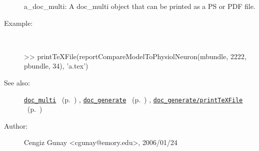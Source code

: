 \begin{description}
	a\_doc\_multi: A doc\_multi object that can be printed as a PS or PDF file.
%
\item[Example:]~
\begin{lyxcode} >> printTeXFile(reportCompareModelToPhysiolNeuron(mbundle, 2222, pbundle, 34), 'a.tex')
\\%
\end{lyxcode}
%
\item[See also:]%
\hyperlink{ref_doc_multi}{\texttt{doc\_multi}}%
\ (p.~\pageref{ref_doc_multi})%
%
, \hyperlink{ref_doc_generate}{\texttt{doc\_generate}}%
\ (p.~\pageref{ref_doc_generate})%
%
, \hyperlink{ref_doc_generate__printTeXFile}{\texttt{doc\_generate/printTeXFile}}%
\ (p.~\pageref{ref_doc_generate__printTeXFile})%
%
%
\item[Author:]%
Cengiz Gunay <cgunay@emory.edu>, 2006/01/24
%
\end{description}
\methodline%
